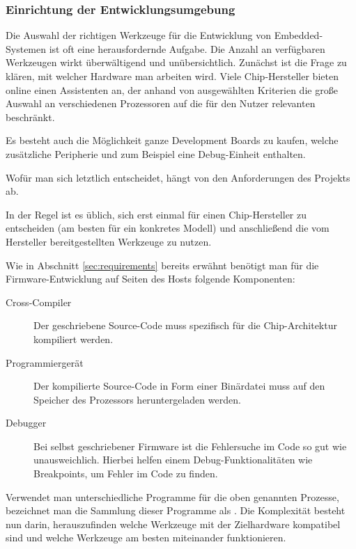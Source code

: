 		\subsubsection{Einrichtung der Entwicklungsumgebung}
        Die Auswahl der richtigen Werkzeuge für die Entwicklung von Embedded-Systemen ist oft eine herausfordernde
        Aufgabe. Die Anzahl an verfügbaren Werkzeugen wirkt überwältigend und unübersichtlich.
        Zunächst ist die Frage zu klären, mit welcher Hardware man arbeiten wird. Viele Chip-Hersteller bieten online
        einen Assistenten an, der anhand von ausgewählten Kriterien die große Auswahl an verschiedenen Prozessoren auf
        die für den Nutzer relevanten beschränkt.

        Es besteht auch die Möglichkeit ganze Development Boards zu kaufen, welche zusätzliche Peripherie und
        zum Beispiel eine Debug-Einheit enthalten.

        Wofür man sich letztlich entscheidet, hängt von den Anforderungen des Projekts ab.

        In der Regel ist es üblich, sich erst einmal für einen Chip-Hersteller zu entscheiden (am besten für ein
        konkretes Modell) und anschließend die vom Hersteller bereitgestellten Werkzeuge zu nutzen.

        Wie in Abschnitt \ref{sec:requirements} bereits erwähnt benötigt man für die Firmware-Entwicklung auf Seiten des Hosts
        folgende Komponenten:
        \begin{description}
            \item[Cross-Compiler] Der geschriebene Source\hyp{}Code muss spezifisch für die Chip\hyp{}Architektur kompiliert werden.
            \item[Programmiergerät] Der kompilierte Source-Code in Form einer Binärdatei muss auf den Speicher des
            Prozessors heruntergeladen werden.
            \item[Debugger] Bei selbst geschriebener Firmware ist die Fehlersuche im Code so gut wie unausweichlich.
            Hierbei helfen einem Debug-Funktionalitäten wie Breakpoints, um Fehler im Code zu finden.
        \end{description}

        Verwendet man unterschiedliche Programme für die oben genannten Prozesse, bezeichnet man die Sammlung dieser
        Programme als . Die Komplexität besteht nun darin, herauszufinden welche Werkzeuge mit der
        Zielhardware kompatibel sind und welche Werkzeuge am besten miteinander funktionieren.

